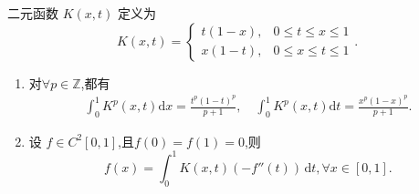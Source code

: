 \documentclass[../../main.tex]{subfiles}
\begin{document}
\begin{lemma}\label{lemma:K(x,t)的性质}
二元函数 \( K(x, t) \) 定义为
\[
K(x, t) = \begin{cases} 
t(1 - x), & 0 \leqslant t \leqslant x \leqslant 1 \\
x(1 - t), & 0 \leqslant x \leqslant t \leqslant 1
\end{cases}.
\]
\begin{enumerate}[(1)]
\item 对$\forall p\in \mathbb{Z}$,都有
\begin{gather*}
\int_0^1{K^p\left( x,t \right) \mathrm{d}x}=\frac{t^p\left( 1-t \right) ^p}{p+1},
\quad 
\int_0^1{K^p\left( x,t \right) \mathrm{d}t}=\frac{x^p\left( 1-x \right) ^p}{p+1}.
\end{gather*}

\item 设 \( f\in C^2[0,1] \),且$f(0)=f(1)=0$,则
\[
f(x)=\int_{0}^{1} K(x, t)(-f''(t)) \, \mathrm{d}t,\forall x\in [0,1].
\]
\end{enumerate}
\end{lemma}
\end{document}
